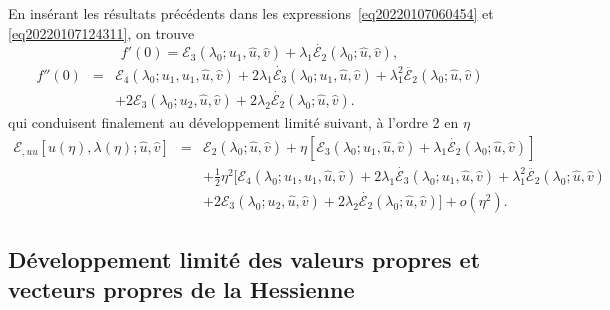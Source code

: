 \documentclass{article}
\begin{document}
En ins{\'e}rant les r{\'e}sultats pr{\'e}c{\'e}dents dans les
expressions~\eqref{eq20220107060454} et \eqref{eq20220107124311}, on trouve
\begin{equation}
  f' (0) =\mathcal{E}_3 (\lambda_0 ; u_1, \hat{u}, \hat{v}) + \lambda_1
  \dot{\mathcal{E}_2} (\lambda_0 ; \hat{u}, \hat{v}),
\end{equation}
\begin{eqnarray}
  f'' (0) & = & \mathcal{E}_4 (\lambda_0 ; u_1, u_1, \hat{u}, \hat{v}) + 2
  \lambda_1  \dot{\mathcal{E}_3} (\lambda_0 ; u_1, \hat{u}, \hat{v}) +
  \lambda_1^2  \ddot{\mathcal{E}_2} (\lambda_0 ; \hat{u}, \hat{v}) \nonumber\\
  &  &  + 2\mathcal{E}_3 (\lambda_0 ; u_2, \hat{u}, \hat{v}) + 2
  \lambda_2  \dot{\mathcal{E}_2} (\lambda_0 ; \hat{u}, \hat{v}) .
\end{eqnarray}
qui conduisent finalement au d{\'e}veloppement limit{\'e} suivant, {\`a}
l'ordre 2 en $\eta$
\begin{eqnarray}
  \mathcal{E}_{, u  u} [u (\eta), \lambda (\eta) ; \hat{u}, \hat{v}] &
  = & \mathcal{E}_2 (\lambda_0 ; \hat{u}, \hat{v}) + \eta [\mathcal{E}_3
  (\lambda_0 ; u_1, \hat{u}, \hat{v})   + \lambda_1
  \dot{\mathcal{E}_2} (\lambda_0 ; \hat{u}, \hat{v})] \nonumber\\
  &  &  + \tfrac{1}{2} \eta^2  [\mathcal{E}_4 (\lambda_0 ; u_1, u_1,
  \hat{u}, \hat{v})  + 2 \lambda_1  \dot{\mathcal{E}_3} (\lambda_0 ;
  u_1, \hat{u}, \hat{v}) + \lambda_1^2  \ddot{\mathcal{E}_2} (\lambda_0 ;
  \hat{u}, \hat{v}) \nonumber\\
  &  &   + 2\mathcal{E}_3 (\lambda_0 ; u_2, \hat{u},
  \hat{v}) + 2 \lambda_2  \dot{\mathcal{E}_2} (\lambda_0 ; \hat{u}, \hat{v})]
  + o (\eta^2) .
\end{eqnarray}

\subsection{D{\'e}veloppement limit{\'e} des valeurs propres et vecteurs
propres de la Hessienne}
\end{document}
